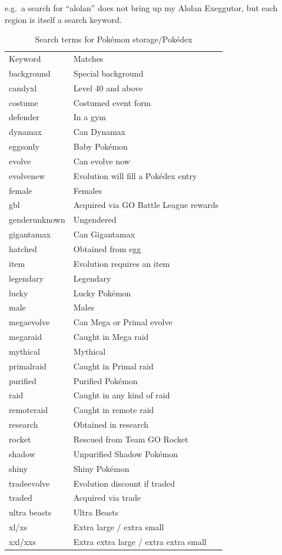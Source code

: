  e.g.\ a search for ``alolan'' does not bring up my Alolan Exeggutor,
 but each region is itself a search keyword.
\begin{table}
\centering
\begin{tabular}{ll}
Keyword & Matches \\
\Midrule
background & Special background \\
candyxl & Level 40 and above \\
costume & Costumed event form \\
defender & In a gym \\
dynamax & Can Dynamax\\
eggsonly & Baby Pokémon \\
evolve & Can evolve now\\
evolvenew & Evolution will fill a Pokédex entry\\
female & Females \\
gbl & Acquired via GO Battle League rewards\\
genderunknown & Ungendered \\
gigantamax & Can Gigantamax\\
hatched & Obtained from egg \\
item & Evolution requires an item\\
legendary & Legendary \\
lucky & Lucky Pokémon \\
male & Males\\
megaevolve & Can Mega or Primal evolve\\
megaraid & Caught in Mega raid\\
mythical & Mythical\\
primalraid & Caught in Primal raid\\
purified & Purified Pokémon\\
raid & Caught in any kind of raid\\
remoteraid & Caught in remote raid\\
research & Obtained in research\\
rocket & Rescued from Team GO Rocket\\
shadow & Unpurified Shadow Pokémon\\
shiny & Shiny Pokémon\\
tradeevolve & Evolution discount if traded\\
traded & Acquired via trade\\
ultra beasts & Ultra Beasts\\
xl/xs & Extra large / extra small\\
xxl/xxs & Extra extra large / extra extra small\\
\end{tabular}
  \caption{Search terms for Pokémon storage/Pokédex\label{table:searchterms}}
\end{table}
